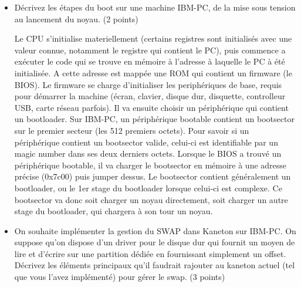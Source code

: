 \begin{correction}

\begin{itemize}
    \item
        D\'ecrivez les \'etapes du boot sur une machine IBM-PC, de la mise sous tension au lancement du noyau. (2 points)

        Le CPU s'initialise materiellement (certains registres sont initialis\'es avec une valeur connue, notamment le registre qui contient le PC), puis commence a ex\'ecuter le code qui se trouve en m\'emoire \`a l'adresse \`a laquelle le PC \`a \'et\'e initialis\'ee. A cette adresse est mapp\'ee une ROM qui contient un firmware (le BIOS). Le firmware se charge d'initialiser les periph\'eriques de base, requis pour d\'emarrer la machine (\'ecran, clavier, disque dur, disquette, controlleur USB, carte r\'eseau parfois). Il va ensuite choisir un p\'eriph\'erique qui contient un bootloader. Sur IBM-PC, un p\'eriph\'erique bootable contient un bootsector sur le premier secteur (les 512 premiers octets). Pour savoir si un p\'eriph\'erique contient un bootsector valide, celui-ci est identifiable par un magic number dans ses deux derniers octets. Lorsque le BIOS a trouv\'e un p\'eriph\'erique bootable, il va charger le bootsector en m\'emoire \`a une adresse pr\'ecise (0x7c00) puis jumper dessus. Le bootsector contient g\'en\'eralement un bootloader, ou le 1er stage du bootloader lorsque celui-ci est complexe. Ce bootsector va donc soit charger un noyau directement, soit charger un autre stage du bootloader, qui chargera \`a son tour un noyau.
    \item
        On souhaite impl\'ementer la gestion du SWAP dans Kaneton sur IBM-PC. On suppose qu'on dispose d'un driver pour le disque dur qui fournit un moyen de lire et d'\'ecrire sur une partition d\'edi\'ee en fournissant simplement un offset. D\'ecrivez les \'el\'ements principaux qu'il faudrait rajouter au kaneton actuel (tel que vous l'avez impl\'ement\'e) pour g\'erer le swap. (3 points)


\end{itemize}
\end{correction}
